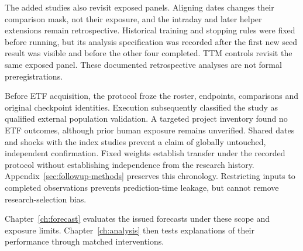 The added studies also revisit exposed panels. Aligning dates changes their comparison mask, not their exposure, and the intraday and later helper extensions remain retrospective. Historical training and stopping rules were fixed before running, but its analysis specification was recorded after the first new seed result was visible and before the other four completed. TTM controls revisit the same exposed panel. These documented retrospective analyses are not formal preregistrations.

Before ETF acquisition, the protocol froze the roster, endpoints, comparisons and original checkpoint identities. Execution subsequently classified the study as qualified external population validation. A targeted project inventory found no ETF outcomes, although prior human exposure remains unverified. Shared dates and shocks with the index studies prevent a claim of globally untouched, independent confirmation. Fixed weights establish transfer under the recorded protocol without establishing independence from the research history. Appendix~\ref{sec:followup-methods} preserves this chronology. Restricting inputs to completed observations prevents prediction-time leakage, but cannot remove research-selection bias.

Chapter~\ref{ch:forecast} evaluates the issued forecasts under these scope and exposure limits. Chapter~\ref{ch:analysis} then tests explanations of their performance through matched interventions.
